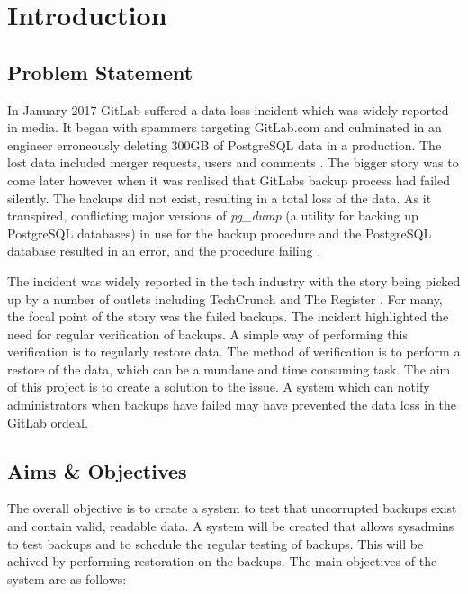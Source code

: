 \section{Introduction}

\subsection{Problem Statement}
In January 2017 GitLab suffered a data loss incident which was widely reported in media. It began with spammers targeting GitLab.com and culminated in an engineer erroneously deleting 300GB of PostgreSQL data in a production. The lost data included merger requests, users and comments \citep{gitlab1}. The bigger story was to come later however when it was realised that GitLabs backup process had failed silently. The backups did not exist, resulting in a total loss of the data. As it transpired, conflicting major versions of \textit{pg\_dump} (a utility for backing up PostgreSQL databases) in use for the backup procedure and the PostgreSQL database resulted in an error, and the procedure failing \citep{gitlab2}.

The incident was widely reported in the tech industry with the story being picked up by a number of outlets including TechCrunch \citeyearpar{lomas} and The Register \citeyearpar{sharwood}. For many, the focal point of the story was the failed backups. The incident highlighted the need for regular verification of backups. A simple way of performing this verification is to regularly restore data. The method of verification is to perform a restore of the data, which can be a mundane and time consuming task. The aim of this project is to create a solution to the issue. A system which can notify administrators when backups have failed may have prevented the data loss in the GitLab ordeal.

\subsection{Aims \& Objectives}
The overall objective is to create a system to test that uncorrupted backups exist and contain valid, readable data. A system will be created that allows sysadmins to test backups and to schedule the regular testing of backups. This will be achived by performing restoration on the backups. The main objectives of the system are as follows:

